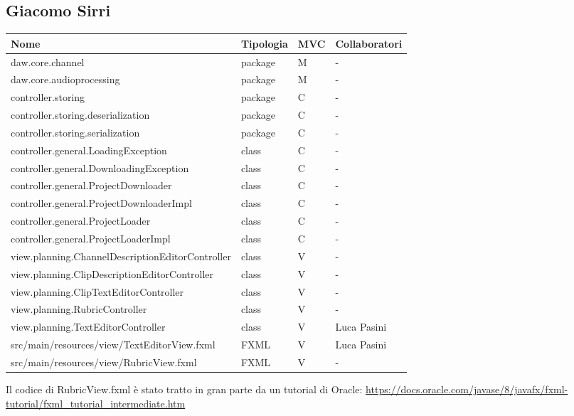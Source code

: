 \documentclass[a4paper,12pt]{report}
\begin{document}
\subsection{Giacomo Sirri}
\begin{center}
\begin{longtable}{| m{22.5em} | m{2cm}| m{1cm} | m{2.7cm} |} 
 \hline
   \textbf{Nome} & \textbf{Tipologia} & \textbf{MVC} & \textbf{Collaboratori} \\ [0.5ex] 
 \hline
  daw.core.channel & package & M & - \\
  \hline
daw.core.audioprocessing & package & M & - \\
\hline
controller.storing & package & C & - \\
\hline
controller.storing.deserialization & package & C & - \\
\hline
controller.storing.serialization & package & C & - \\
\hline
controller.general.LoadingException & class & C & - \\
\hline
controller.general.DownloadingException & class & C & - \\
\hline
controller.general.ProjectDownloader & class & C & - \\
\hline
controller.general.ProjectDownloaderImpl & class & C & - \\
\hline
controller.general.ProjectLoader & class & C & - \\
\hline
controller.general.ProjectLoaderImpl & class & C & - \\
\hline
view.planning.ChannelDescriptionEditorController & class & V & - \\
\hline
view.planning.ClipDescriptionEditorController & class & V & - \\
\hline
view.planning.ClipTextEditorController & class & V & - \\
\hline
view.planning.RubricController & class & V & - \\
\hline
view.planning.TextEditorController & class & V & Luca Pasini \\
\hline
src/main/resources/view/TextEditorView.fxml & FXML & V & Luca Pasini \\
\hline
src/main/resources/view/RubricView.fxml & FXML & V & - \\
\hline
\end{longtable}
\end{center}
Il codice di RubricView.fxml è stato tratto in gran parte da un tutorial di Oracle:
\href{https://docs.oracle.com/javase/8/javafx/fxml-tutorial/fxml\_tutorial\_intermediate.htm}{https://docs.oracle.com/javase/8/javafx/fxml-tutorial/fxml\_tutorial\_intermediate.htm}
\end{document}
